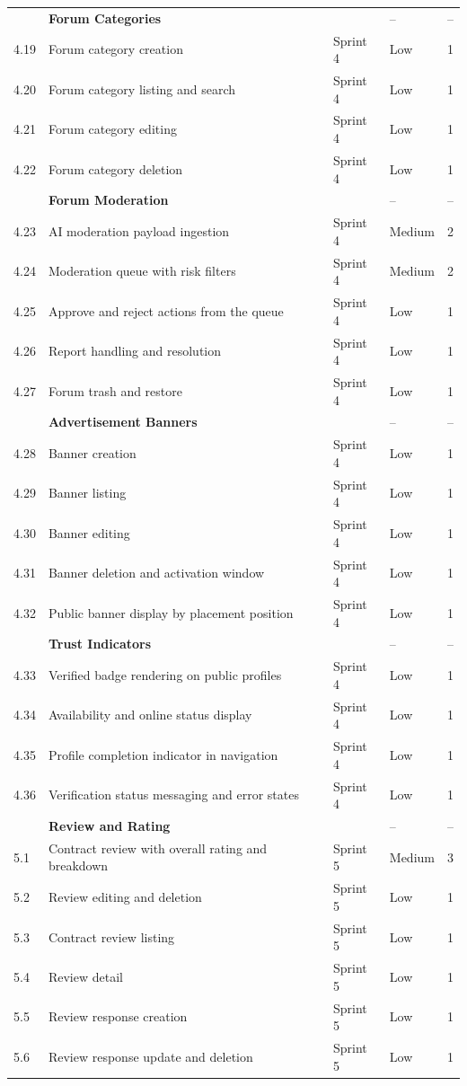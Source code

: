 \begin{longtable}{|
C{1.0cm}|
L{6.9cm}|
C{1.8cm}|
C{2.1cm}|
C{2.3cm}|}
 & \textbf{Forum Categories} &  & -- & -- \\
4.19 & Forum category creation & Sprint 4 & Low & 1 \\
4.20 & Forum category listing and search & Sprint 4 & Low & 1 \\
4.21 & Forum category editing & Sprint 4 & Low & 1 \\
4.22 & Forum category deletion & Sprint 4 & Low & 1 \\
\hline

 & \textbf{Forum Moderation} &  & -- & -- \\
4.23 & AI moderation payload ingestion & Sprint 4 & Medium & 2 \\
4.24 & Moderation queue with risk filters & Sprint 4 & Medium & 2 \\
4.25 & Approve and reject actions from the queue & Sprint 4 & Low & 1 \\
4.26 & Report handling and resolution & Sprint 4 & Low & 1 \\
4.27 & Forum trash and restore & Sprint 4 & Low & 1 \\
\hline

 & \textbf{Advertisement Banners} &  & -- & -- \\
4.28 & Banner creation & Sprint 4 & Low & 1 \\
4.29 & Banner listing & Sprint 4 & Low & 1 \\
4.30 & Banner editing & Sprint 4 & Low & 1 \\
4.31 & Banner deletion and activation window & Sprint 4 & Low & 1 \\
4.32 & Public banner display by placement position & Sprint 4 & Low & 1 \\
\hline

 & \textbf{Trust Indicators} &  & -- & -- \\
4.33 & Verified badge rendering on public profiles & Sprint 4 & Low & 1 \\
4.34 & Availability and online status display & Sprint 4 & Low & 1 \\
4.35 & Profile completion indicator in navigation & Sprint 4 & Low & 1 \\
4.36 & Verification status messaging and error states & Sprint 4 & Low & 1 \\
\hline


 & \textbf{Review and Rating} &  & -- & -- \\
5.1 & Contract review with overall rating and breakdown & Sprint 5 & Medium & 3 \\
5.2 & Review editing and deletion & Sprint 5 & Low & 1 \\
5.3 & Contract review listing & Sprint 5 & Low & 1 \\
5.4 & Review detail & Sprint 5 & Low & 1 \\
5.5 & Review response creation & Sprint 5 & Low & 1 \\
5.6 & Review response update and deletion & Sprint 5 & Low & 1 \\
\hline


\end{longtable}
